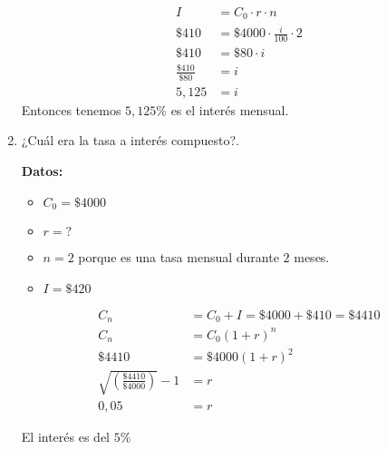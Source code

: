 \documentclass[12pt]{examdesign}
\theoremstyle{plain}
\theoremstyle{definition}
\theoremstyle{remark}
\begin{document}
\begin{shortanswer}[title={Leemos el material de consulta y realizamos las actividades propuestas.}, rearrange=no]
\begin{question}
\begin{answer}
\begin{enumerate}
        			\begin{align*}
        			    I&=C_{0}\cdot r\cdot n\\
        			    \$410&=\$4000\cdot \frac{i}{100}\cdot 2\\
        			    \$410&=\$80\cdot i\\
        			    \frac{\$410}{\$80}&= i\\
        			    5,125&= i
        			\end{align*}
        			Entonces tenemos $5,125\%$ es el interés mensual.
        			
        			\item ¿Cuál era la tasa a interés compuesto?.
        			
        			\textbf{Datos:}
        			\begin{itemize}
        				\item $C_{0}=\$4000$
        				\item $r=?$
        				\item $n=2$ porque es una tasa mensual durante $2$ meses.
        				\item $I=\$420$
        			\end{itemize}
        		
        			\begin{align*}
        			    C_{n}                                           & = C_{0}+I=\$4000 + \$410=\$4410         \\[0.2cm]
        			    C_{n}                                           & = C_{0}\left( 1+r\right)^{n}            \\[0.2cm]
        			    \$4410                                          & = \$4000\left( 1+r\right)^{2}           \\[0.2cm]
        			    \sqrt{\left( \frac{\$4410}{\$4000}\right) } - 1 & = r                     \\[0.2cm]
        			                                                             0,05& = r 
        			\end{align*}
        			
        			El interés es del $5\%$
        		\end{enumerate}
        	\end{answer}
        \end{question}
        

\end{shortanswer}
\end{document}

